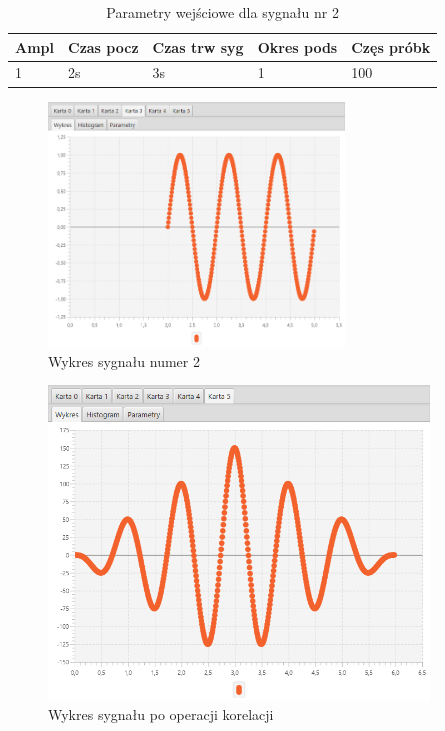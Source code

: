 \documentclass[12pt]{article}
\begin{document}
{{{                \begin{table}[H]
                    \centering
                    \begin{tabular}{|l|l|l|l|l|}
                        \hline
                        Ampl & Czas pocz & Czas trw syg & Okres pods & Częs próbk   \\ \hline
                        1 & 2s & 3s & 1 & 100           \\ \hline
                    \end{tabular}
                    \caption{Parametry wejściowe dla sygnału nr 2}
                \end{table}
                \begin{figure}[H]
                    \centering
                    \includegraphics[width=0.7\textwidth]{img/result/correlation/experiment1/data_105856.png}
                    \caption{Wykres sygnału numer 2}
                \end{figure}

                \begin{figure}[H]
                    \centering
                    \includegraphics[width=0.9\textwidth]{img/result/correlation/experiment1/data_105906.png}
                    \caption{Wykres sygnału po operacji korelacji}
                \end{figure}
            }
            \newpage

}}
\end{document}
